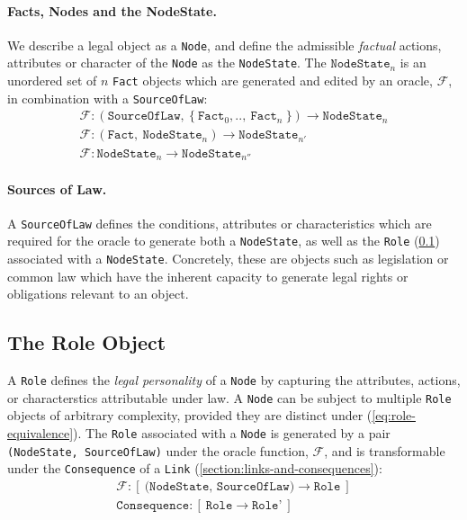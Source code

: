\documentclass{article}
\numberwithin{equation}{section}
\begin{document}

\paragraph{Facts, Nodes and the NodeState.} We describe a legal object as a \texttt{Node}, and define the admissible \textit{factual} actions, attributes or character of the \texttt{Node} as the \texttt{NodeState}. The $\texttt{NodeState}_n$ is an unordered set of $n$  \texttt{Fact} objects which are generated and edited by an oracle, $\mathcal{F}$, in combination with a \texttt{SourceOfLaw}: %
\begin{align}
	\mathcal{F}: (\texttt{SourceOfLaw}, \ \{ \ \texttt{Fact}_0, .., \ \texttt{Fact}_n \ \}) \rightarrow \texttt{NodeState}_n \\
	\mathcal{F}: (\texttt{Fact}, \ \texttt{NodeState}_n) \rightarrow \texttt{NodeState}_{n'} \\
	\mathcal{F}: \texttt{NodeState}_n \rightarrow \texttt{NodeState}_{n''}
\end{align}

\paragraph{Sources of Law.} A \texttt{SourceOfLaw} defines the conditions, attributes or characteristics which are required for the oracle to generate both a \texttt{NodeState}, as well as the \texttt{Role} (\ref{section:role-object}) associated with a \texttt{NodeState}. Concretely, these are objects such as legislation or common law which have the inherent capacity to generate legal rights or obligations relevant to an object.


\subsection{The Role Object} \label{section:role-object}

A \texttt{Role} defines the \textit{legal personality} of a \texttt{Node} by capturing the attributes, actions, or characterstics attributable under law. A \texttt{Node} can be subject to multiple \texttt{Role} objects of arbitrary complexity, provided they are distinct under (\ref{eq:role-equivalence}). The \texttt{Role} associated with a \texttt{Node} is generated by a pair \texttt{(NodeState, SourceOfLaw)} under the oracle function, $\mathcal{F}$, and is transformable under the \texttt{Consequence} of a \texttt{Link} (\ref{section:links-and-consequences}): 
\begin{align}	
	\mathcal{F} : [ \ \texttt{(NodeState, SourceOfLaw)} \rightarrow \texttt{Role} \ ] \\
	\texttt{Consequence} : [ \ \texttt{Role} \rightarrow \texttt{Role'} \ ]
\end{align}
\end{document}

